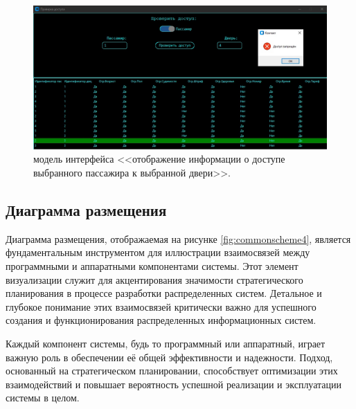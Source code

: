 \begin{figure} [ht]
	\centering
	\includegraphics[width=1\linewidth]{images/Example3}
	\caption{модель интерфейса <<отображение информации о доступе выбранного пассажира к выбранной двери>>.}
	\label{fig:example3}
\end{figure}

\subsection{Диаграмма размещения}

Диаграмма размещения, отображаемая на рисунке \ref{fig:commonscheme4}, является фундаментальным инструментом для иллюстрации взаимосвязей между программными и аппаратными компонентами системы. Этот элемент визуализации служит для акцентирования значимости стратегического планирования
в процессе разработки распределенных систем. Детальное и глубокое понимание этих взаимосвязей критически важно для успешного создания и функционирования распределенных информационных систем.

Каждый компонент системы, будь то программный или аппаратный, играет важную роль в обеспечении её общей эффективности и надежности.
Подход, основанный на стратегическом планировании, способствует оптимизации этих взаимодействий и повышает вероятность успешной реализации и эксплуатации системы в целом.


